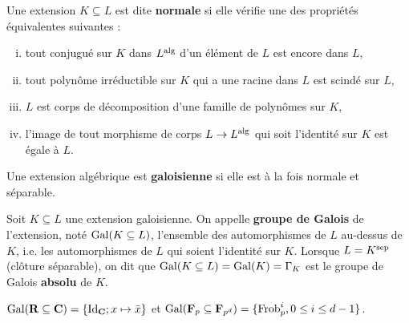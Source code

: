 	\begin{defn}
		Une extension $K \subseteq L$ est dite \textbf{normale} si elle vérifie une des propriétés équivalentes suivantes :
		\begin{enumerate}[(i)]
			\item tout conjugué sur $K$ dans $L^{\operatorname{alg}}$ d'un élément de $L$ est encore dans $L$,
			\item tout polynôme irréductible sur $K$ qui a une racine dans $L$ est scindé sur $L$,
			\item $L$ est corps de décomposition d'une famille de polynômes sur $K$,
			\item l'image de tout morphisme de corps $L \to L^{\operatorname{alg}}$ qui soit l'identité sur $K$ est égale à $L$.
		\end{enumerate}
	\end{defn}
	
	\begin{defn}
		Une extension algébrique est \textbf{galoisienne} si elle est à la fois normale et séparable.
	\end{defn}
	
	\begin{defn}
		Soit $K \subseteq L$ une extension galoisienne.
		On appelle \textbf{groupe de Galois} de l'extension, noté $\operatorname{Gal}(K \subseteq L)$, l'ensemble des automorphismes de $L$ au-dessus de $K$, i.e. les automorphismes de $L$ qui soient l'identité sur $K$.
		Lorsque $L = K^{\operatorname{sep}}$ (clôture séparable), on dit que $\operatorname{Gal}(K \subseteq L) = \operatorname{Gal}(K) = \Gamma_K$ est le groupe de Galois \textbf{absolu} de $K$.
	\end{defn}
	
	\begin{ex}
		$\operatorname{Gal}(\mathbf{R} \subseteq \mathbf{C}) = \{ \operatorname{Id}_{\mathbf{C}} ; x \mapsto \bar{x} \}$ et $\operatorname{Gal}(\mathbf{F}_p \subseteq \mathbf{F}_{p^d}) = \{ \operatorname{Frob}_p^i, 0 \leq i \leq d - 1 \}$.
	\end{ex}
	
